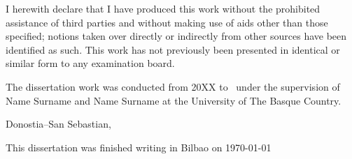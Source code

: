 



\ifpdf
    \graphicspath{{backmatter/figures/PNG/}{backmatter/figures/PDF/}{backmatter/figures/}}
\else
    \graphicspath{{backmatter/figures/EPS/}{backmatter/figures/}}
\fi



\begin{declaration}        %

I herewith declare that I have produced this work without the prohibited assistance of third parties and without making use of aids other than those specified; notions taken over directly or indirectly from other sources have been identified as such. This work has not previously been presented in identical or similar form to any examination board.

The dissertation work was conducted from 20XX to \the\year \ under the supervision of
Name Surname
and 
Name Surname
at 
the University of The Basque Country.

\vspace{10mm}

Donostia--San Sebastian,




\end{declaration}




\thispagestyle{empty}

\hfill
\vfill
\medskip

\begin{center}
\noindent
This dissertation was finished writing 
in 
Bilbao
on
\today 
\end{center}

